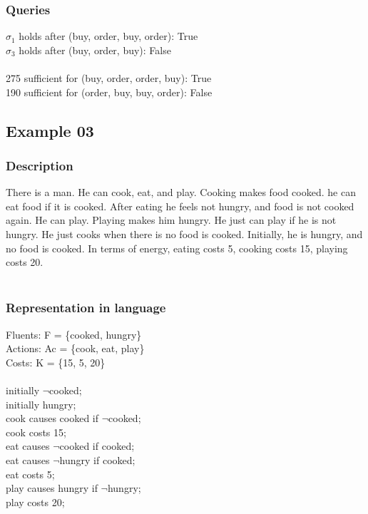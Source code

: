 \documentclass[11pt]{article}
\begin{document}
	\subsubsection{Queries}
	$\sigma_{1}$ holds after (buy, order, buy, order): True\\
	$\sigma_{3}$ holds after (buy, order, buy): False\\
	\\
	275 sufficient for (buy, order, order, buy): True\\
	190 sufficient for (order, buy, buy, order): False\\
	\subsection{Example 03}
	\subsubsection{Description}\label{par:p103}
	There is a man. He can cook, eat, and play. Cooking makes food cooked. he can eat food if it is cooked. After eating he feels not hungry, and food is not cooked again. He can play. Playing makes him hungry. He just can play if he is not hungry. He just cooks when there is no food is cooked. Initially, he is hungry, and no food is cooked. In terms of energy, eating costs 5, cooking costs 15, playing costs 20.\\
	\\
	\subsubsection{Representation in language}\label{par:p203}
	Fluents: F = \{cooked, hungry\}\\
	Actions: Ac = \{cook, eat, play\}\\
	Costs: K = \{15, 5, 20\}
	\\
	\\
	initially $\neg$cooked;\\
	initially hungry;\\
	cook causes cooked if $\neg$cooked;\\
	cook costs 15;\\
	eat causes $\neg$cooked if cooked;\\
	eat causes $\neg$hungry if cooked;\\
	eat costs 5;\\
	play causes hungry if $\neg$hungry;\\
	play costs 20;\\
	\\
\end{document}
